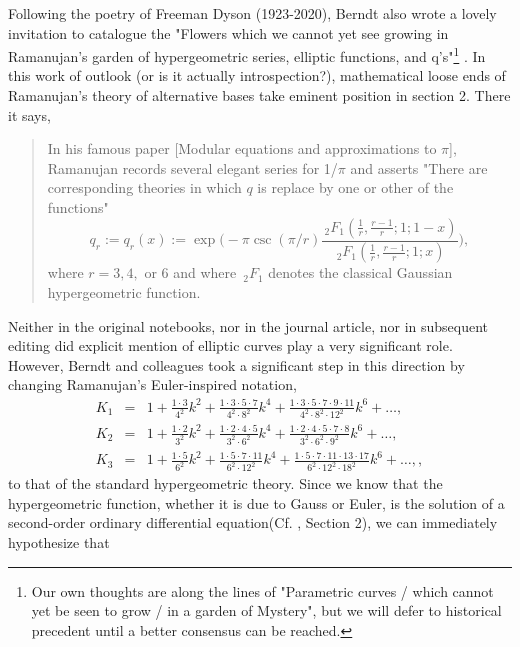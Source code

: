 \documentclass[nofootinbib,preprint]{revtex4-1}
\begin{document}
Following the poetry of Freeman Dyson (1923-2020), Berndt also wrote a lovely invitation 
to catalogue the "Flowers which we cannot yet see growing in Ramanujan's 
garden of hypergeometric series, elliptic functions, and q's"\footnote{Our own 
thoughts are along the lines of "Parametric curves / which cannot yet be seen to grow / in a garden of Mystery",
but we will defer to historical precedent until a better consensus can be reached.}
\cite{BERNDTFLOWERS}. 
In this work of outlook (or is it actually introspection?), mathematical loose ends 
of Ramanujan's theory of alternative bases take eminent position in section 2. There it says,
\begin{quote}
In his famous paper [Modular equations and approximations to $\pi$], Ramanujan 
records several elegant series for 1/$\pi$ and asserts "There are corresponding 
theories in which $q$ is replace by one or other of the functions" 
$$q_r:=q_r(x):=\exp\bigg(-\pi \csc(\pi/r)\frac{\,_2F_1(\frac{1}{r},\frac{r-1}{r};1;1-x)
}{\,_2F_1(\frac{1}{r},\frac{r-1}{r};1;x)} \bigg),$$ where
$r=3,4,$ or $6$ and where $\,_2F_1$ denotes the classical Gaussian hypergeometric 
function.  
\end{quote}
Neither in the original notebooks, nor in the journal article, nor in subsequent 
editing did explicit mention of elliptic curves play a very significant role. 
However, Berndt and colleagues took a significant step in this direction by changing
Ramanujan's Euler-inspired notation, 
\begin{eqnarray}
K_1 &=& 1 + \frac{1 \cdot 3}{4^2}k^2 + \frac{1 \cdot 3 \cdot 5 \cdot 7}{4^2 \cdot 8^2}k^4 
          + \frac{1 \cdot 3 \cdot 5 \cdot 7 \cdot 9 \cdot 11}{4^2 \cdot 8^2 \cdot 12^2}k^6
          + \ldots  \nonumber ,  \\
K_2 &=& 1 + \frac{1 \cdot 2}{3^2}k^2 + \frac{1 \cdot 2 \cdot 4 \cdot 5}{3^2 \cdot 6^2}k^4 
          + \frac{1 \cdot 2 \cdot 4 \cdot 5 \cdot 7 \cdot 8}{3^2 \cdot 6^2 \cdot 9^2}k^6
          + \ldots  \nonumber ,  \\
K_3 &=& 1 + \frac{1 \cdot 5}{6^2}k^2 + \frac{1 \cdot 5 \cdot 7 \cdot 11}{6^2 \cdot 12^2}k^4 
          + \frac{1 \cdot 5 \cdot 7 \cdot 11 \cdot 13 \cdot 17}{6^2 \cdot 12^2 \cdot 18^2}k^6
          + \ldots  \nonumber ,   , 
\end{eqnarray}
to that of the standard hypergeometric theory. Since we know that the hypergeometric function, 
whether it is due to Gauss or Euler, is the solution of a second-order ordinary 
differential equation(Cf. \cite{KZ2001}, Section 2), we can immediately hypothesize that 
\end{document}
